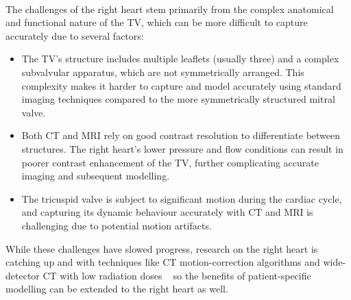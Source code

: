 \\
The challenges of the right heart stem primarily from the complex anatomical and functional nature of the \gls{TV}, which can be more difficult to capture accurately due to several factors:

\begin{itemize}
    \item The \gls{TV}'s structure includes multiple leaflets (usually three) and a complex subvalvular apparatus, which are not symmetrically arranged. This complexity makes it harder to capture and model accurately using standard imaging techniques compared to the more symmetrically structured mitral valve.

    \item Both CT and MRI rely on good contrast resolution to differentiate between structures. The right heart's lower pressure and flow conditions can result in poorer contrast enhancement of the \gls{TV}, further complicating accurate imaging and subsequent modelling.~

    \item The tricuspid valve is subject to significant motion during the cardiac cycle, and capturing its dynamic behaviour accurately with CT and MRI is challenging due to potential motion artifacts.~
\end{itemize}
While these challenges have slowed progress, research on the right heart is catching up and with techniques like \gls{CT} motion-correction algorithms and wide-detector \gls{CT} with low radiation doses ~ so the benefits of patient-specific modelling can be extended to the right heart as well.
